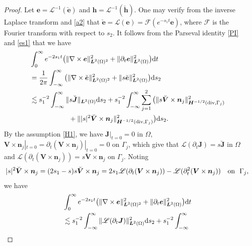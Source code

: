 \documentclass[11pt,reqno]{amsart}
\numberwithin{equation}{section}
\begin{document}
\begin{proof}
Let $\boldsymbol e=\mathscr L^{-1} (\breve {\boldsymbol e})$ and $\boldsymbol
h =\mathscr L^{-1} (\breve {\boldsymbol h})$.
One may verify from the inverse Laplace transform and \eqref{a2} that $
\breve {\boldsymbol e} =\mathscr L (\boldsymbol e) =\mathscr F (e^{-s_1 t} 
\boldsymbol e)$, where $\mathscr F $ is the Fourier transform with respect to
$s_2$. It follows from the Parseval identity \eqref{PI} and \eqref{es1} that we
have
\begin{align*}
&\int_0^{\infty} e^{-2 s_1 t}  \big ( \|\nabla \times \boldsymbol e
\|_{\boldsymbol L^2(\Omega)^2}^2
+\|\partial_t \boldsymbol e\|^2_{\boldsymbol L^2(\Omega)}\big) {\rm d} t\\
&=\frac{1}{2 \pi} \int_{-\infty}^{\infty} \big(  \|\nabla \times
\breve{\boldsymbol e} \|_{\boldsymbol L^2(\Omega)^2}^2
+\|s\breve{\boldsymbol e}\|^2_{\boldsymbol L^2(\Omega)}\big) {\rm d} s_2\\
& \lesssim s_1 ^{-2} \int_{-\infty}^{\infty} \|s \breve {\boldsymbol
J}\|_{\boldsymbol L^2 (\Omega)} {\rm d} s_2+
s_1^{-2}\int_{-\infty}^{\infty} \sum\limits_{j=1}^2
 \big(\|s \breve {\boldsymbol V} \times \boldsymbol n_j\|^2_{\boldsymbol
H^{-1/2} ({\rm div}, \Gamma_j)}\\
&\hspace{2cm} + \||s|^2 \breve {\boldsymbol V} \times \boldsymbol
n_j\|^2_{\boldsymbol H^{-1/2} ({\rm div}, \Gamma_j)}
 \big){\rm d} s_2.
\end{align*}
By the assumption \eqref{H1}, we have $\boldsymbol J|_{t=0}=0$ in $\Omega$,
$\boldsymbol V \times \boldsymbol n_j|_{t=0}=\partial_t (\boldsymbol V
\times \boldsymbol n_j)|_{t=0}=0$ on $\Gamma_j$, which give that $\mathscr L
(\partial_t \boldsymbol J)= s \breve {\boldsymbol J}$ in $\Omega$ and $\mathscr
L (\partial_t (\boldsymbol V \times \boldsymbol n_j)) = s \breve {\boldsymbol V}
\times \boldsymbol n_j$ on $\Gamma_j.$ Noting
\[
|s|^2 \breve {\boldsymbol V} \times \boldsymbol n_j= (2 s_1-s) s\breve
{\boldsymbol V} \times \boldsymbol n_j = 2 s_1 \mathscr L (\partial_t
(\boldsymbol V\times \boldsymbol n_j)) -\mathscr L (\partial_t^2 (\boldsymbol V
\times \boldsymbol n_j)) \quad
{\rm on}~~ \Gamma_j,
\]
we have
\begin{align*}
&\int_0^{\infty}
e^{-2 s_1 t}  \big ( \|\nabla \times \boldsymbol e \|_{\boldsymbol
L^2(\Omega)^2}^2
+\|\partial_t \boldsymbol e\|^2_{\boldsymbol L^2(\Omega)}\big) {\rm d} t\\
&\lesssim s_1^{-2} \int_{-\infty}^{\infty} \|\mathscr L (\partial_t \boldsymbol
J)\|^2_{\boldsymbol L^2 (\Omega)} {\rm d} s_2 +s_1^{-2} \int_{-\infty}^{\infty} 

\end{align*}
\end{proof}
\end{document}
